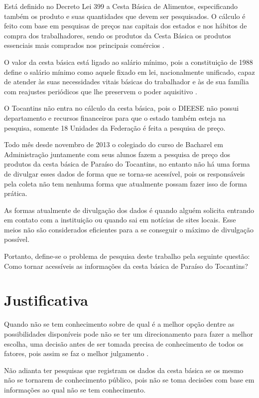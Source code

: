 \documentclass{ifto-tex}
\begin{document}
		Está definido no Decreto Lei 399 a Cesta Básica de Alimentos, especificando também os produto e suas quantidades que devem ser pesquisados. O cálculo é feito com base em pesquisas de preços nas capitais dos estados e nos hábitos de compra dos trabalhadores, sendo os produtos da Cesta Básica os produtos essenciais mais comprados nos principais comércios \cite{metodolo8:online}.
		
		O valor da cesta básica está ligado ao salário mínimo, pois a constituição de 1988 define o salário mínimo como aquele fixado em lei, nacionalmente unificado, capaz de atender às suas necessidades vitais básicas do trabalhador e às de sua família com reajustes periódicos que lhe preservem o poder aquisitivo \cite{metodolo8:online}.
		
		O Tocantins não entra no cálculo da cesta básica, pois o DIEESE não possui departamento e recursos financeiros para que o estado também esteja na pesquisa, somente 18 Unidades da Federação é feita a pesquisa de preço.
		
		Todo mês desde novembro de 2013 o colegiado do curso de Bacharel em Administração juntamente com seus alunos fazem a pesquisa de preço dos produtos da cesta básica de Paraíso do Tocantins, no entanto não há uma forma de divulgar esses dados de forma que se torna-se acessível, pois os responsáveis pela coleta não tem nenhuma forma que atualmente possam fazer isso de forma prática.
		
		As formas atualmente de divulgação dos dados é quando alguém solicita entrando em contato com a instituição ou quando sai em notícias de sites locais. Esse meios não são considerados eficientes para a se conseguir o máximo de divulgação possível.
		
		Portanto, define-se o problema de pesquisa deste trabalho pela seguinte questão: Como tornar acessíveis as informações da cesta básica de Paraíso do Tocantins?
		
	
\chapter{Justificativa}
	
		Quando não se tem conhecimento sobre de qual é a melhor opção dentre as possibilidades disponíveis pode não se ter um direcionamento para fazer a melhor escolha, uma decisão antes de ser tomada precisa de conhecimento de todos os fatores, pois assim se faz o melhor julgamento \cite{bezerra2013efeito}.
		
		Não adianta ter pesquisas que registram os dados da cesta básica se os mesmo não se tornarem de conhecimento público, pois não se toma decisões com base em informações ao qual não se tem conhecimento.
		
\end{document}
